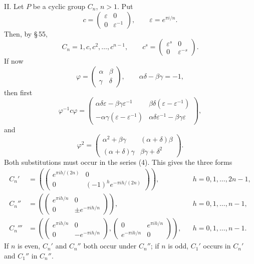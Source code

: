 \documentclass[11pt]{article}
\begin{document}
II. Let $P$ be a cyclic group $C_n$, $n>1$. Put
\begin{equation}
 c=\begin{pmatrix}\varepsilon&0\\0&\varepsilon^{-1}\end{pmatrix},
 \qquad \varepsilon=e^{\pi i/n}. \tag{3}
\end{equation}
Then, by \S\,55,
\begin{equation}
 C_n=1,c,c^2,\ldots,c^{n-1},\qquad
 c^s=\begin{pmatrix}\varepsilon^s&0\\0&\varepsilon^{-s}\end{pmatrix}. \tag{4}
\end{equation}
If now
\begin{equation}
 \varphi=\begin{pmatrix}\alpha&\beta\\\gamma&\delta\end{pmatrix},
 \qquad \alpha\delta-\beta\gamma=-1, \tag{5}
\end{equation}
then first
\begin{equation}
 \varphi^{-1}c\varphi=
 \begin{pmatrix}
 \alpha\delta\varepsilon-\beta\gamma\varepsilon^{-1}&
 \beta\delta(\varepsilon-\varepsilon^{-1})\\
 -\alpha\gamma(\varepsilon-\varepsilon^{-1})&
 \alpha\delta\varepsilon^{-1}-\beta\gamma\varepsilon
 \end{pmatrix}, \tag{6}
\end{equation}
and
\begin{equation}
 \varphi^2=
 \begin{pmatrix}
 \alpha^2+\beta\gamma&(\alpha+\delta)\beta\\
 (\alpha+\delta)\gamma&\beta\gamma+\delta^2
 \end{pmatrix}. \tag{7}
\end{equation}
Both substitutions must occur in the series (4). This gives the three forms
\[
\begin{aligned}
 C_n'&=\left(
 \begin{pmatrix}e^{\pi i h/(2n)}&0\\
 0&(-1)^h e^{-\pi i h/(2n)}\end{pmatrix}
 \right), &&h=0,1,\ldots,2n-1,\\[0.4em]
 C_n''&=\left(
 \begin{pmatrix}e^{\pi i h/n}&0\\
 0&\pm e^{-\pi i h/n}\end{pmatrix}
 \right), &&h=0,1,\ldots,n-1,\\[0.4em]
 C_n'''&=\left(
 \begin{pmatrix}e^{\pi i h/n}&0\\0&-e^{-\pi i h/n}\end{pmatrix},
 \begin{pmatrix}0&e^{\pi i h/n}\\ e^{-\pi i h/n}&0\end{pmatrix}
 \right), &&h=0,1,\ldots,n-1.
\end{aligned}
\]
If $n$ is even, $C_n'$ and $C_n''$ both occur under $C_n''$; if $n$ is odd, $C_1'$ occurs in $C_n'$ and $C_1''$ in $C_n''$.
\end{document}
